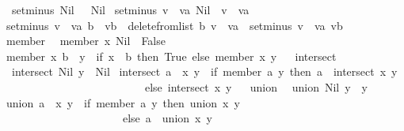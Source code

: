 \begin{isabellebody}
\ \ {\isachardoublequoteopen}setminus\ Nil\ {\isacharunderscore}\ {\isacharequal}\ Nil{\isachardoublequoteclose}\isanewline
{\isacharbar}\ {\isachardoublequoteopen}setminus\ {\isacharparenleft}v\ {\isacharhash}\ va{\isacharparenright}\ Nil\ {\isacharequal}\ {\isacharparenleft}v\ {\isacharhash}\ va{\isacharparenright}{\isachardoublequoteclose}\isanewline
{\isacharbar}\ {\isachardoublequoteopen}setminus\ {\isacharparenleft}v\ {\isacharhash}\ va{\isacharparenright}\ {\isacharparenleft}b\ {\isacharhash}\ vb{\isacharparenright}\ {\isacharequal}\ {\isacharparenleft}{\isacharparenleft}delete{\isacharunderscore}from{\isacharunderscore}list\ b\ {\isacharparenleft}v\ {\isacharhash}\ va{\isacharparenright}{\isacharparenright}\ {\isacharat}\ {\isacharparenleft}setminus\ {\isacharparenleft}v\ {\isacharhash}\ va{\isacharparenright}\ vb{\isacharparenright}{\isacharparenright}{\isachardoublequoteclose}\isanewline
\isanewline
\ \isanewline
{}\isamarkupfalse%
\ member\isanewline
{}\isanewline
\ \ {\isachardoublequoteopen}member\ x\ Nil\ {\isacharequal}\ False{\isachardoublequoteclose}\isanewline
{\isacharbar}\ {\isachardoublequoteopen}member\ x\ {\isacharparenleft}b\ {\isacharhash}\ y{\isacharparenright}\ {\isacharequal}\ {\isacharparenleft}if\ x\ {\isacharequal}\ b\ then\ True\ else\ member\ x\ y{\isacharparenright}{\isachardoublequoteclose}\isanewline
\isanewline
\ \isanewline
{}\isamarkupfalse%
\ intersect\isanewline
{}\isanewline
\ \ {\isachardoublequoteopen}intersect\ Nil\ y\ {\isacharequal}\ Nil{\isachardoublequoteclose}\isanewline
{\isacharbar}\ {\isachardoublequoteopen}intersect\ {\isacharparenleft}a\ {\isacharhash}\ x{\isacharparenright}\ y\ {\isacharequal}\ {\isacharparenleft}if\ member\ a\ y\ then\ a\ {\isacharhash}\ {\isacharparenleft}intersect\ x\ y{\isacharparenright}\isanewline
\ \ \ \ \ \ \ \ \ \ \ \ \ \ \ \ \ \ \ \ \ \ \ \ \ \ else\ intersect\ x\ y{\isacharparenright}{\isachardoublequoteclose}\isanewline
\isanewline
\ \isanewline
{}\isamarkupfalse%
\ union\isanewline
{}\isanewline
\ \ {\isachardoublequoteopen}union\ Nil\ y\ {\isacharequal}\ y{\isachardoublequoteclose}\isanewline
{\isacharbar}\ {\isachardoublequoteopen}union\ {\isacharparenleft}a\ {\isacharhash}\ x{\isacharparenright}\ y\ {\isacharequal}\ {\isacharparenleft}if\ {\isacharparenleft}member\ a\ y{\isacharparenright}\ then\ {\isacharparenleft}union\ x\ y{\isacharparenright}\isanewline
\ \ \ \ \ \ \ \ \ \ \ \ \ \ \ \ \ \ \ \ \ \ else\ a\ {\isacharhash}\ {\isacharparenleft}union\ x\ y{\isacharparenright}{\isacharparenright}{\isachardoublequoteclose}\isanewline

\end{isabellebody}
